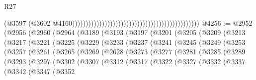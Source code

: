 \begin{lexlean}{R27}
\begin{coremodule}
                                                                                              (@3597
                                                                                                (@3602
                                                                                                  @4160)))))))))))))))))))))))))))))))))))))))))))))))
@4256 := @2952
    (@2956
      (@2960
        (@2964
          (@3189
            (@3193
              (@3197
                (@3201
                  (@3205
                    (@3209
                      (@3213
                        (@3217
                          (@3221
                            (@3225
                              (@3229
                                (@3233
                                  (@3237
                                    (@3241
                                      (@3245
                                        (@3249
                                          (@3253
                                            (@3257
                                              (@3261
                                                (@3265
                                                  (@3269
                                                    (@2628
                                                      (@3273
                                                        (@3277
                                                          (@3281
                                                            (@3285
                                                              (@3289
                                                                (@3293
                                                                  (@3297
                                                                    (@3302
                                                                      (@3307
                                                                        (@3312
                                                                          (@3317
                                                                            (@3322
                                                                              (@3327
                                                                                (@3332
                                                                                  (@3337
                                                                                    (@3342
                                                                                      (@3347
                                                                                        (@3352

\end{coremodule}
\end{lexlean}
